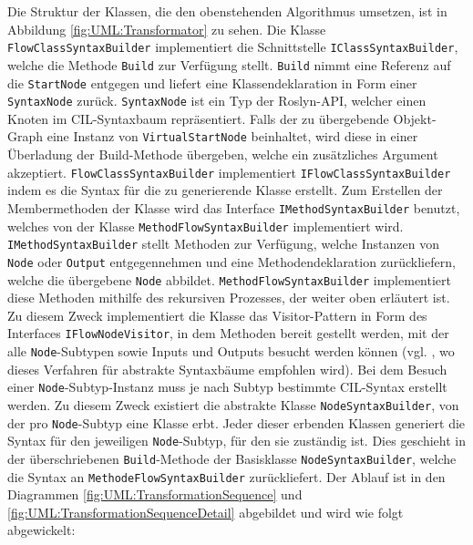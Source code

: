 \newline
Die Struktur der Klassen, die den obenstehenden Algorithmus umsetzen, ist in Abbildung \ref{fig:UML:Transformator} zu sehen. Die Klasse \texttt{FlowClassSyntaxBuilder} implementiert die Schnittstelle \texttt{IClassSyntaxBuilder}, welche die Methode \texttt{Build} zur Verfügung stellt. \texttt{Build} nimmt eine Referenz auf die \texttt{StartNode} entgegen und liefert eine Klassendeklaration in Form einer \texttt{SyntaxNode} zurück. \texttt{SyntaxNode} ist ein Typ der Roslyn-API, welcher einen Knoten im CIL-Syntaxbaum repräsentiert. Falls der zu übergebende Objekt-Graph eine Instanz von \texttt{VirtualStartNode} beinhaltet, wird diese in einer Überladung der Build-Methode übergeben, welche ein zusätzliches Argument akzeptiert. \texttt{FlowClassSyntaxBuilder} implementiert \texttt{IFlowClassSyntaxBuilder} indem es die Syntax für die zu generierende Klasse erstellt. Zum Erstellen der Membermethoden der Klasse wird das Interface \texttt{IMethodSyntaxBuilder} benutzt, welches von der Klasse \texttt{Meth\-od\-Flow\-Syn\-tax\-Buil\-der} implementiert wird. \texttt{IMe\-thod\-Syn\-tax\-Buil\-der} stellt Methoden zur Verfügung, welche Instanzen von \texttt{Node} oder \texttt{Output} entgegennehmen und eine Methodendeklaration zurückliefern, welche die übergebene \texttt{Node} abbildet. \texttt{Meth\-od\-Flow\-Syn\-tax\-Buil\-der} implementiert diese Methoden mithilfe des rekursiven Prozesses, der weiter oben erläutert ist. Zu diesem Zweck implementiert die Klasse das Visitor-Pattern in Form des Interfaces \texttt{IFlowNodeVisitor}, in dem Methoden bereit gestellt werden, mit der alle \texttt{Node}-Subtypen sowie Inputs und Outputs besucht werden können (vgl. \cite[S. 5f]{Jones}, wo dieses Verfahren für abstrakte Syntaxbäume empfohlen wird). Bei dem Besuch einer \texttt{Node}-Subtyp-Instanz muss je nach Subtyp bestimmte CIL-Syntax erstellt werden. Zu diesem Zweck existiert die abstrakte Klasse \texttt{NodeSyntaxBuilder}, von der pro \texttt{Node}-Subtyp eine Klasse erbt. Jeder dieser erbenden Klassen generiert die Syntax für den jeweiligen \texttt{Node}-Subtyp, für den sie zuständig ist. Dies geschieht in der überschriebenen \texttt{Build}-Methode der Basisklasse \texttt{NodeSyntaxBuilder}, welche die Syntax an \texttt{MethodeFlowSyntaxBuilder} zurückliefert. Der Ablauf ist in den Diagrammen \ref{fig:UML:TransformationSequence} und \ref{fig:UML:TransformationSequenceDetail} abgebildet und wird wie folgt abgewickelt:

